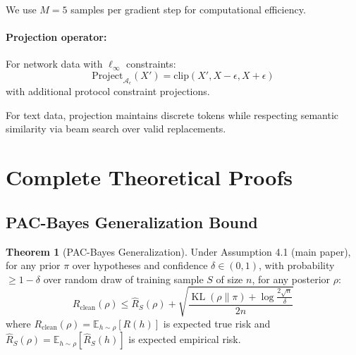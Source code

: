 \documentclass[12pt,a4paper]{article}
\theoremstyle{definition}
\newtheorem{theorem}{Theorem}[section]
\DeclareMathOperator{\KL}{KL}
\begin{document}
We use $M=5$ samples per gradient step for computational efficiency.

\paragraph{Projection operator:}
For network data with $\ell_\infty$ constraints:
\begin{equation}
\text{Project}_{\mathcal{A}_\epsilon}(X') = \text{clip}(X', X - \epsilon, X + \epsilon)
\end{equation}
with additional protocol constraint projections.

For text data, projection maintains discrete tokens while respecting semantic similarity via beam search over valid replacements.

\section{Complete Theoretical Proofs}
\label{app:proofs}

\subsection{PAC-Bayes Generalization Bound}

\begin{theorem}[PAC-Bayes Generalization]
\label{thm:pac_bayes_gen}
Under Assumption 4.1 (main paper), for any prior $\pi$ over hypotheses and confidence $\delta \in (0,1)$, with probability $\ge 1-\delta$ over random draw of training sample $S$ of size $n$, for any posterior $\rho$:
\begin{equation}
R_{\text{clean}}(\rho) \leq \hat{R}_S(\rho) + \sqrt{\frac{\KL(\rho\|\pi) + \log\frac{2\sqrt{n}}{\delta}}{2n}}
\end{equation}
where $R_{\text{clean}}(\rho) = \mathbb{E}_{h\sim\rho}[R(h)]$ is expected true risk and $\hat{R}_S(\rho) = \mathbb{E}_{h\sim\rho}[\hat{R}_S(h)]$ is expected empirical risk.
\end{theorem}
\end{document}
